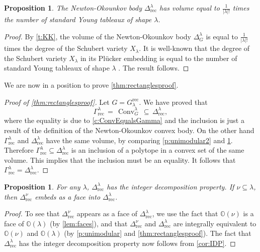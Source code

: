 \documentclass{amsart}
\newtheorem{proposition}[thm]{Proposition}
\theoremstyle{definition}
\numberwithin{equation}{section}
\newcommand{\conv}{\operatorname{Conv}}
\newcommand{\Q}{\Gamma}
\newcommand{\rect}{\mathrm{rec}}
\newcommand{\OO}{\mathbb{O}}
\begin{document}
\begin{proposition}\label{c:VolumeOfNOBody}
The Newton-Okounkov body $\Delta^\lambda_{\rect}$ has volume equal to $\frac{1}{|\lambda|!}$ times the number
 of standard Young tableaux of shape $\lambda$.
\end{proposition}
\begin{proof}
By \cref{t:KK}, the volume of the Newton-Okounkov body $\Delta_{G}^\lambda$ is equal to $\frac{1}{|\lambda|!}$ times the degree of the Schubert variety $X_\lambda$. 
It is well-known 
that 
the degree of the Schubert variety $X_{\lambda}$ in its Pl\"ucker embedding is equal to the number of standard Young tableaux
	of shape $\lambda$ \cite{LS}.  The result follows.
\end{proof}

We are now in a position to prove \cref{thm:rectanglesproof}.
\begin{proof}[Proof of \cref{thm:rectanglesproof}]
Let $G=G^{\rect}_\lambda$. We have proved that
\[\Q^\lambda_\rect\,=\,\conv_G^{\lambda}\,\subseteq\, \Delta^\lambda_\rect,
\]
where the equality is due to \cref{c:ConvEqualsGamma} and the inclusion is just a result of the definition of the Newton-Okounkov convex body. On the other hand $\Q^{\lambda}_\rect$ and $\Delta^\lambda_\rect$ have the same volume, by comparing 
	\cref{p:unimodular2} 
	and \cref{c:VolumeOfNOBody}. 
Therefore $\Q^\lambda_\rect \subseteq \Delta^\lambda_\rect$ is an inclusion of a polytope in a convex set of the same volume. This implies that the inclusion must be an equality. It follows that $ \Q^\lambda_\rect= \Delta^\lambda_\rect$. 
\end{proof}



\begin{proposition}\label{cor:IDP2} 
For any  $\lambda$,
$\Delta^\lambda_\rect$ has the integer decomposition property.
If $\nu \subseteq \lambda$,
then $\Delta^{\nu}_{\rect}$ embeds as a face
into $\Delta^{\lambda}_{\rect}$.
\end{proposition}
\begin{proof}
To see that
$\Delta^{\nu}_{\rect}$ appears as a face
of $\Delta^{\lambda}_{\rect}$, we use
the fact that
$\OO(\nu)$ is a face of $\OO(\lambda)$ (by
\cref{lem:faces}), and that
 $\Delta^{\nu}_{\rect}$ and
 $\Delta^{\lambda}_{\rect}$ are integrally equivalent to
$\OO(\nu)$ and $\OO(\lambda)$
(by
\cref{p:unimodular} and
\cref{thm:rectanglesproof}).
The fact that $\Delta^\lambda_\rect$ has the integer decomposition property  now follows from \cref{cor:IDP}.
\end{proof}
\end{document}

